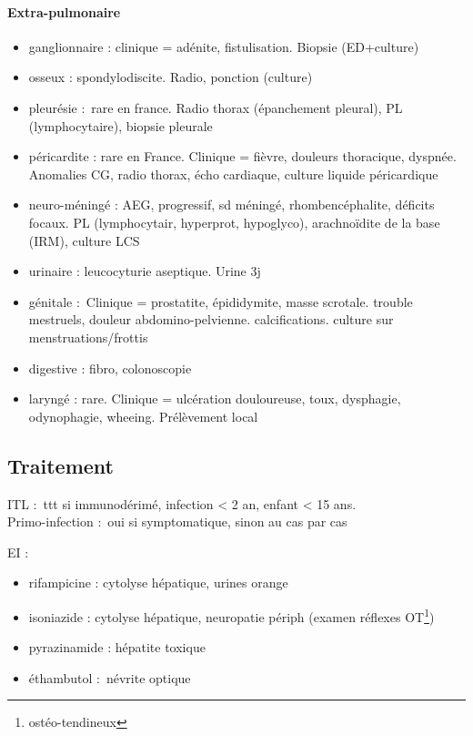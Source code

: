 \documentclass{article}
\begin{document}
\paragraph{Extra-pulmonaire}
\begin{itemize}
  \item ganglionnaire : clinique = adénite, fistulisation. Biopsie (ED+culture)
  \item osseux : spondylodiscite. Radio, ponction (culture)
  \item pleurésie : rare en france. Radio thorax (épanchement pleural), PL
    (lymphocytaire), biopsie pleurale
  \item péricardite : rare en France. Clinique = fièvre, douleurs thoracique,
    dyspnée. Anomalies CG, radio thorax, écho cardiaque, culture liquide
    péricardique
  \item neuro-méningé : AEG, progressif, sd méningé, rhombencéphalite, déficits
    focaux. PL (lymphocytair, hyperprot, hypoglyco), arachnoïdite de la base
    (IRM), culture LCS
  \item urinaire : leucocyturie aseptique. Urine 3j
  \item génitale : Clinique = \male{} prostatite, épididymite, masse scrotale. \female{}
    trouble mestruels, douleur abdomino-pelvienne. \male{} calcifications.
    \female{} culture sur menstruations/frottis
  \item digestive : fibro, colonoscopie
  \item laryngé : rare. Clinique = ulcération douloureuse, toux, dysphagie,
    odynophagie, wheeing. Prélèvement local
\end{itemize}

\subsection{Traitement}%

ITL : ttt si immunodérimé, infection < 2 an, enfant < 15 ans.\\
Primo-infection : oui si symptomatique, sinon au cas par cas

EI : 
\begin{itemize}
  \item rifampicine : cytolyse hépatique, urines orange
  \item isoniazide : cytolyse hépatique, neuropatie périph (examen réflexes
    OT\footnote{ostéo-tendineux})
  \item pyrazinamide : hépatite toxique
  \item éthambutol : névrite optique
\end{itemize}
\end{document}
